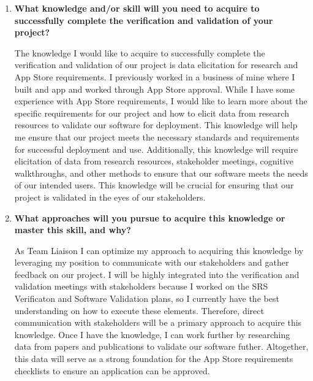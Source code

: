 \documentclass[10pt,titlepage]{article}
\begin{document}
\begin{enumerate}
  I was able to resolve my first pain point by using Claude Opus 5.5 to give me starting lists for the checklists. I did this by passing in the SRS document and VnV Plan 
  Course rubric and then describing my goal. Then after a first draft, I had a goal to achieve and I used it to guide actually generating more specific and meaningful checklists. 
  To solve my second pain point, I communicated with my team about my dilemma and they helped me to decide to send a message in Teams chat and email our TA. Our TA responded to me 
  the morning of the deliverable deadline which was perfect timing! He advised to include at least one article to demonstrate in the template how the validation plan would actually 
  be executed. With this in mind, I found a meta-analysis article and used it to fill out Table \ref{tab:ResearchMapping} and justify how it validated the stakeholder requirements
  STR2.
  \item \textbf{What knowledge and/or skill will you need to acquire to successfully complete the verification and validation of your project?}
  
  The knowledge I would like to acquire to successfully complete the verification and validation of our project is data elicitation for research and App Store requirements. I 
  previously worked in a business of mine where I built and app and worked through App Store approval. While I have some experience with App Store requirements, I would like 
  to learn more about the specific requirements for our project and how to elicit data from research resources to validate our software for deployment. This knowledge will 
  help me ensure that our project meets the necessary standards and requirements for successful deployment and use. Additionally, this knowledge will require elicitation of 
  data from research resources, stakeholder meetings, cognitive walkthroughs, and other methods to ensure that our software meets the needs of our intended users. This 
  knowledge will be crucial for ensuring that our project is validated in the eyes of our stakeholders.

  \item \textbf{What approaches will you pursue to acquire this knowledge or master this skill, and why?}
  
  As Team Liaison I can optimize my approach to acquiring this knowledge by leveraging my position to communicate with our stakeholders and gather feedback on our project.
  I will be highly integrated into the verification and validation meetings with stakeholders because I worked on the SRS Verificaton and Software Validation plans, so I 
  currently have the best understanding on how to execute these elements. Therefore, direct communication with stakeholders will be a primary approach to acquire this knowledge. 
  Once I have the knowledge, I can work further by researching data from papers and publications to validate our software futher. Altogether, this data will serve as a strong 
  foundation for the App Store requirements checklists to ensure an application can be approved.

\end{enumerate}

\newpage



\end{document}
